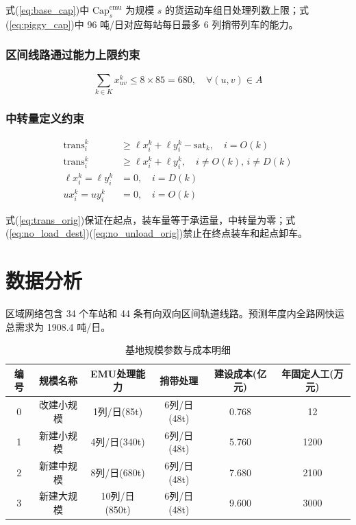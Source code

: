 \documentclass[12pt,a4paper,fontset=none]{ctexart}
\begin{document}
式(\ref{eq:base_cap})中 $\text{Cap}_s^{\text{emu}}$ 为规模 $s$ 的货运动车组日处理列数上限；式(\ref{eq:piggy_cap})中 96 吨/日对应每站每日最多 6 列捎带列车的能力。

\subsubsection{区间线路通过能力上限约束}

\begin{equation}
\sum_{k \in K} x_{uv}^k \leq 8 \times 85 = 680, \quad \forall (u,v) \in A \label{eq:edge_cap}
\end{equation}

\subsubsection{中转量定义约束}

\begin{align}
\text{trans}_i^k &\geq \ell x_i^k + \ell y_i^k - \text{sat}_k, \quad i = O(k) \label{eq:trans_orig}\\
\text{trans}_i^k &\geq \ell x_i^k + \ell y_i^k, \quad i \neq O(k),\, i \neq D(k) \label{eq:trans_mid}\\
\ell x_i^k = \ell y_i^k &= 0, \quad i = D(k) \label{eq:no_load_dest}\\
ux_i^k = uy_i^k &= 0, \quad i = O(k) \label{eq:no_unload_orig}
\end{align}

式(\ref{eq:trans_orig})保证在起点，装车量等于承运量，中转量为零；式(\ref{eq:no_load_dest})(\ref{eq:no_unload_orig})禁止在终点装车和起点卸车。

\section{数据分析}

区域网络包含 34 个车站和 44 条有向双向区间轨道线路。预测年度内全路网快运总需求为 1908.4 吨/日。

\begin{table}[H]
\centering
\small
\setlength{\tabcolsep}{2.5pt}
\caption{基地规模参数与成本明细}
\label{tab:scale_params}
\begin{tabular}{cccccc}
\toprule
编号 & 规模名称 & EMU处理能力 & 捎带处理 & 建设成本(亿元) & 年固定人工(万元) \\
\midrule
0 & 改建小规模 & 1列/日(85t)  & 6列/日(48t) & 0.768 & 12 \\
1 & 新建小规模 & 4列/日(340t) & 6列/日(48t) & 5.760 & 1200 \\
2 & 新建中规模 & 8列/日(680t) & 6列/日(48t) & 7.680 & 2100 \\
3 & 新建大规模 & 10列/日(850t)& 6列/日(48t) & 9.600 & 3000 \\
\bottomrule
\end{tabular}
\end{table}
\end{document}
